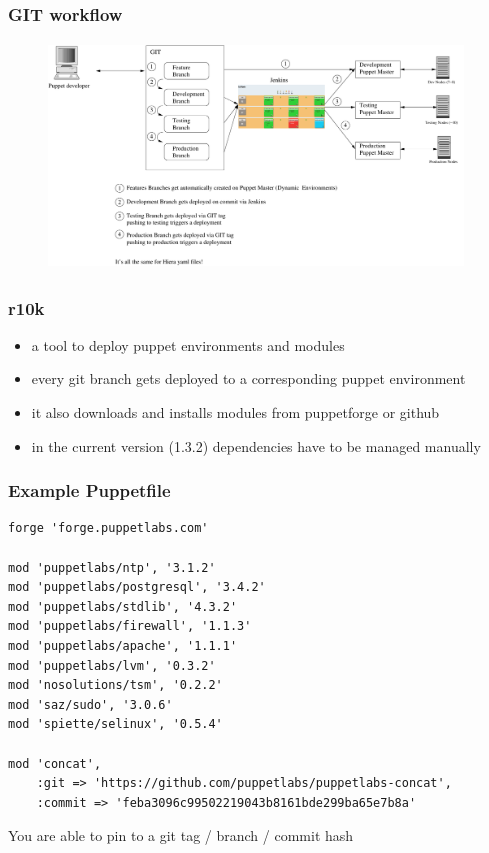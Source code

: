 \documentclass{beamer}
\begin{document}
\begin{frame}
  \frametitle{GIT workflow}
  \begin{figure}
    \centering
      \includegraphics[height=6cm,width=11cm]{../pics/puppet_deployment2}
    \label{fig:stack}
  \end{figure}

\end{frame}

\begin{frame}
  \frametitle{r10k}

  \begin{itemize}
  \item a tool to deploy puppet environments and modules
  \item every git branch gets deployed to a corresponding puppet environment
  \item it also downloads and installs modules from puppetforge or github
  \item in the current version (1.3.2) dependencies have to be managed
    manually
  \end{itemize}
\end{frame}

  \begin{frame}[fragile]
    \frametitle{Example Puppetfile}
\begin{lstlisting}
forge 'forge.puppetlabs.com'

mod 'puppetlabs/ntp', '3.1.2'
mod 'puppetlabs/postgresql', '3.4.2'
mod 'puppetlabs/stdlib', '4.3.2'
mod 'puppetlabs/firewall', '1.1.3'
mod 'puppetlabs/apache', '1.1.1'
mod 'puppetlabs/lvm', '0.3.2'
mod 'nosolutions/tsm', '0.2.2'
mod 'saz/sudo', '3.0.6'
mod 'spiette/selinux', '0.5.4'

mod 'concat',
    :git => 'https://github.com/puppetlabs/puppetlabs-concat',
    :commit => 'feba3096c99502219043b8161bde299ba65e7b8a'
\end{lstlisting}

    You are able to pin to a git tag / branch / commit hash

\end{frame}
\end{document}
